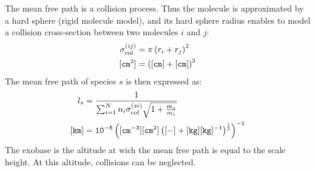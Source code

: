 The mean free path is a collision process. Thus the molecule is approximated
by a hard sphere (rigid molecule model), and its hard sphere radius enables
to model a collision cross-section between two molecules $i$ and $j$:
\begin{equation}
\begin{split}
\sigma^{(ij)}_\text{col} & = \pi\left(r_i + r_j\right)^2 \\
\tt [cm^2]               & \tt = \left([cm] + [cm]\right)^2
\end{split}
\label{sigma_collision}
\end{equation}
The mean free path of species $s$ is then expressed as:
\begin{equation}
\begin{split}
l_s   &     = \frac{1}{\sum_{i=1}^{N}n_i\sigma^{(si)}_\text{col}\sqrt{1 + \frac{m_s}{m_i}}} \\
\tt [km] & \tt = 10^{-5}\left([cm^{-3}] [cm^2] \left([-] + [kg][kg]^{-1}\right)^{\frac{1}{2}}\right)^{-1}
\end{split}
\label{mean_free_path}
\end{equation}
The exobase is the altitude at wich the mean free path is equal to the scale height. At this
altitude, collisions can be neglected.
